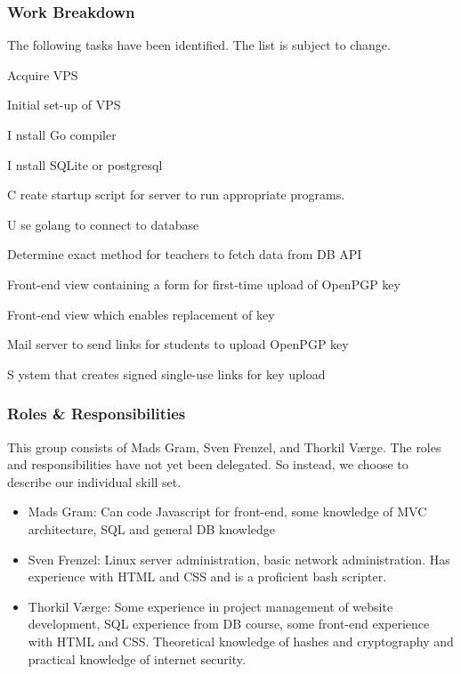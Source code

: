 \documentclass[11pt,a4paper]{article}
\let\OldItem\item
\newcommand{\SubItemStart}[1]{%
    \let\item\SubItemEnd
    \begin{SubItemList}[resume]%
        \OldItem #1%
}
\newcommand{\SubItemMiddle}[1]{%
    \OldItem #1%
}
\newcommand{\SubItemEnd}[1]{%
    \end{SubItemList}%
    \let\item\OldItem
    \item #1%
}
\newcommand*{\SubItem}[1]{%
    \let\SubItem\SubItemMiddle%
    \SubItemStart{#1}%
}%
\begin{document}
\subsubsection{Work Breakdown}
The following tasks have been identified. The list is subject to change.
\begin{itemize}
\item Acquire VPS
\item Initial set-up of VPS
\SubItem Install Go compiler
\SubItem Install SQLite or postgresql
\SubItem Create startup script for server to run appropriate programs.
\item Use golang to connect to database
\item Determine exact method for teachers to fetch data from DB API
\item Front-end view containing a form for first-time upload of OpenPGP key
\item Front-end view which enables replacement of key
\item Mail server to send links for students to upload OpenPGP key
\SubItem System that creates signed single-use links for key upload
\end{itemize}
\subsubsection{Roles \& Responsibilities}
This group consists of Mads Gram, Sven Frenzel, and Thorkil Værge. The roles and responsibilities have not yet been delegated. So instead, we choose to describe our individual skill set.
\begin{itemize}
\item Mads Gram: Can code Javascript for front-end, some knowledge of MVC architecture, SQL and general DB knowledge
\item Sven Frenzel: Linux server administration, basic network administration. Has experience with HTML and CSS and is a proficient bash scripter.
\item Thorkil Værge: Some experience in project management of website development, SQL experience from DB course, some front-end experience with HTML and CSS. Theoretical knowledge of hashes and cryptography and practical knowledge of internet security.
\end{itemize}
\end{document}
